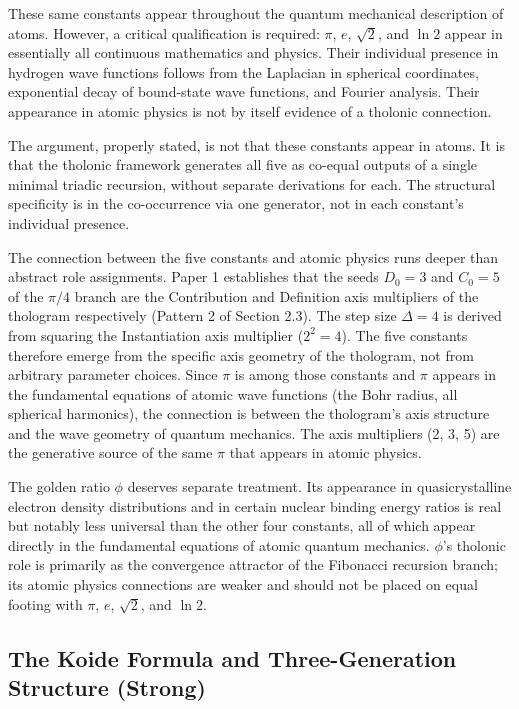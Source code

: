 \documentclass[12pt]{article}
\begin{document}
These same constants appear throughout the quantum mechanical
description of atoms. However, a critical qualification is required:
\(\pi\), \(e\), \(\sqrt{2}\), and \(\ln 2\) appear in essentially all
continuous mathematics and physics. Their individual presence in
hydrogen wave functions follows from the Laplacian in spherical
coordinates, exponential decay of bound-state wave functions, and
Fourier analysis. Their appearance in atomic physics is not by itself
evidence of a tholonic connection.

The argument, properly stated, is not that these constants appear in
atoms. It is that the tholonic framework generates all five as co-equal
outputs of a single minimal triadic recursion, without separate
derivations for each. The structural specificity is in the co-occurrence
via one generator, not in each constant's individual presence.

The connection between the five constants and atomic physics runs deeper
than abstract role assignments. Paper 1 establishes that the seeds
\(D_0 = 3\) and \(C_0 = 5\) of the \(\pi/4\) branch are the Contribution
and Definition axis multipliers of the thologram respectively (Pattern 2
of Section 2.3). The step size \(\Delta = 4\) is derived from squaring
the Instantiation axis multiplier (\(2^2 = 4\)). The five constants
therefore emerge from the specific axis geometry of the thologram, not
from arbitrary parameter choices. Since \(\pi\) is among those constants
and \(\pi\) appears in the fundamental equations of atomic wave
functions (the Bohr radius, all spherical harmonics), the connection is
between the thologram's axis structure and the wave geometry of quantum
mechanics. The axis multipliers (2, 3, 5) are the generative source of
the same \(\pi\) that appears in atomic physics.

The golden ratio \(\phi\) deserves separate treatment. Its appearance in
quasicrystalline electron density distributions and in certain nuclear
binding energy ratios is real but notably less universal than the other
four constants, all of which appear directly in the fundamental
equations of atomic quantum mechanics. \(\phi\)'s tholonic role is
primarily as the convergence attractor of the Fibonacci recursion
branch; its atomic physics connections are weaker and should not be
placed on equal footing with \(\pi\), \(e\), \(\sqrt{2}\), and
\(\ln 2\).

\subsection{The Koide Formula and Three-Generation Structure (Strong)}\label{the-koide-formula-and-three-generation-structure-strong}
\end{document}
